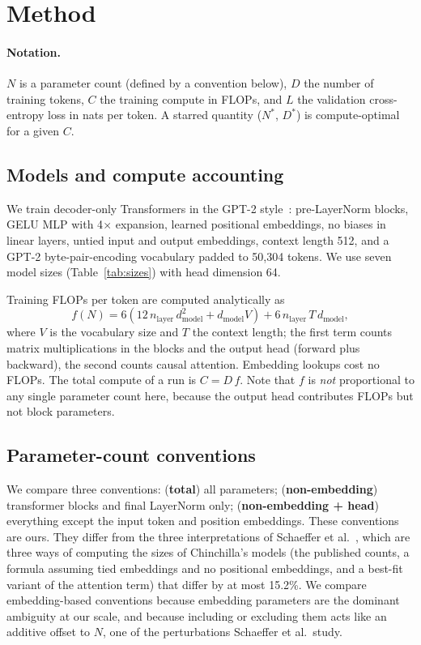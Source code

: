 \section{Method}
\label{sec:method}

\paragraph{Notation.} $N$ is a parameter count (defined by a convention below), $D$ the number of training tokens, $C$ the training compute in FLOPs, and $L$ the validation cross-entropy loss in nats per token. A starred quantity ($N^*$, $D^*$) is compute-optimal for a given $C$.

\subsection{Models and compute accounting}
We train decoder-only Transformers in the GPT-2 style~\citep{radford2019gpt2}: pre-LayerNorm blocks, GELU MLP with 4$\times$ expansion, learned positional embeddings, no biases in linear layers, untied input and output embeddings, context length 512, and a GPT-2 byte-pair-encoding vocabulary padded to 50{,}304 tokens. We use seven model sizes (Table~\ref{tab:sizes}) with head dimension 64.

Training FLOPs per token are computed analytically as
\begin{equation}
  f(N) = 6\left(12\,n_\text{layer}\,d_\text{model}^2 + d_\text{model} V\right) + 6\,n_\text{layer}\,T\,d_\text{model},
\end{equation}
where $V$ is the vocabulary size and $T$ the context length; the first term counts matrix multiplications in the blocks and the output head (forward plus backward), the second counts causal attention. Embedding lookups cost no FLOPs. The total compute of a run is $C = D\,f$. Note that $f$ is \emph{not} proportional to any single parameter count here, because the output head contributes FLOPs but not block parameters.

\subsection{Parameter-count conventions}
\label{sec:conventions}
We compare three conventions: (\textbf{total}) all parameters; (\textbf{non-embedding}) transformer blocks and final LayerNorm only; (\textbf{non-embedding + head}) everything except the input token and position embeddings. These conventions are ours. They differ from the three interpretations of Schaeffer et al.~\citep{schaeffer2025}, which are three ways of computing the sizes of Chinchilla's models (the published counts, a formula assuming tied embeddings and no positional embeddings, and a best-fit variant of the attention term) that differ by at most 15.2\%. We compare embedding-based conventions because embedding parameters are the dominant ambiguity at our scale, and because including or excluding them acts like an additive offset to $N$, one of the perturbations Schaeffer et al.\ study.

